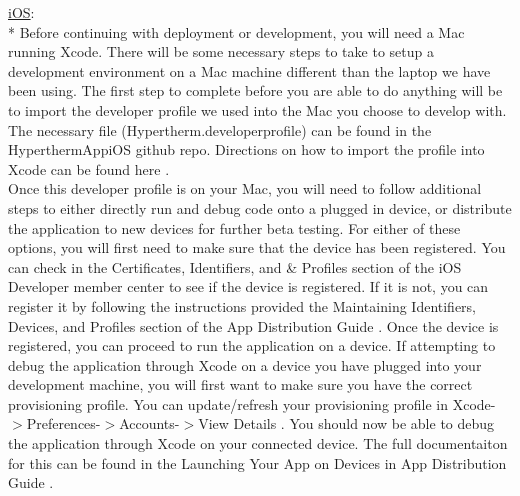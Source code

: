\documentclass[12pt,letterpaper,titlepage]{article}
\begin{document}
\noindent\underline{iOS}:\\*	
Before continuing with deployment or development, you will need a Mac running Xcode. There will be some necessary steps to take to setup a development environment on a Mac machine different than the laptop we have been using. The first step to complete before you are able to do anything will be to import the developer profile we used into the Mac you choose to develop with. The necessary file (Hypertherm.developerprofile) can be found in the HyperthermAppiOS github repo. Directions on how to import the profile into Xcode can be found here \cite{apple distribution guide}.\\

Once this developer profile is on your Mac, you will need to follow additional steps to either directly run and debug code onto a plugged in device, or distribute the application to new devices for further beta testing. For either of these options, you will first need to make sure that the device has been registered. You can check in the Certificates, Identifiers, and \& Profiles section of the iOS Developer member center \cite{apple member center} to see if the device is registered. If it is not, you can register it by following the instructions provided the Maintaining Identifiers, Devices, and Profiles section of the App Distribution Guide \cite{apple distribution guide}. Once the device is registered, you can proceed to run the application on a device. If attempting to debug the application through Xcode on a device you have plugged into your development machine, you will first want to make sure you have the correct provisioning profile. You can update/refresh your provisioning profile in Xcode-$>$Preferences-$>$Accounts-$>$View Details \cite{apple distribution guide}. You should now be able to debug the application through Xcode on your connected device. The full documentaiton for this can be found in the Launching Your App on Devices in App Distribution Guide \cite{apple distribution guide}.\\
\end{document}
